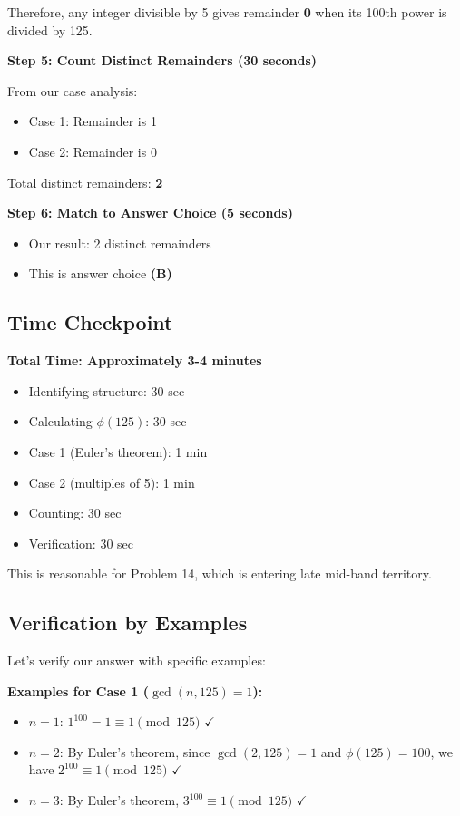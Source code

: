 \documentclass[12pt]{article}
\begin{document}
\begin{solutionbox}
Therefore, any integer divisible by 5 gives remainder \textbf{0} when its 100th power is divided by 125.

\textbf{Step 5: Count Distinct Remainders (30 seconds)}

From our case analysis:
\begin{itemize}
    \item Case 1: Remainder is 1
    \item Case 2: Remainder is 0
\end{itemize}

Total distinct remainders: \textbf{2}

\textbf{Step 6: Match to Answer Choice (5 seconds)}
\begin{itemize}
    \item Our result: 2 distinct remainders
    \item This is answer choice \textbf{(B)}
\end{itemize}

\subsection*{Time Checkpoint}

\textbf{Total Time: Approximately 3-4 minutes}
\begin{itemize}
    \item Identifying structure: 30 sec
    \item Calculating $\phi(125)$: 30 sec
    \item Case 1 (Euler's theorem): 1 min
    \item Case 2 (multiples of 5): 1 min
    \item Counting: 30 sec
    \item Verification: 30 sec
\end{itemize}

This is reasonable for Problem 14, which is entering late mid-band territory.

\subsection*{Verification by Examples}

Let's verify our answer with specific examples:

\textbf{Examples for Case 1 ($\gcd(n, 125) = 1$):}

\begin{itemize}
    \item $n = 1$: $1^{100} = 1 \equiv 1 \pmod{125}$ $\checkmark$
    \item $n = 2$: By Euler's theorem, since $\gcd(2, 125) = 1$ and $\phi(125) = 100$, we have $2^{100} \equiv 1 \pmod{125}$ $\checkmark$
    \item $n = 3$: By Euler's theorem, $3^{100} \equiv 1 \pmod{125}$ $\checkmark$
\end{itemize}


\end{solutionbox}
\end{document}
